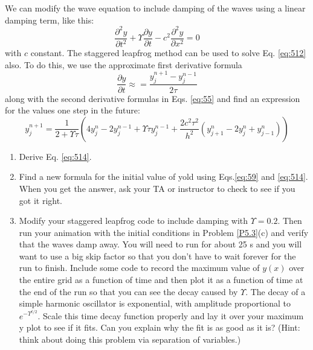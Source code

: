 We can modify the wave equation to include damping of the waves using a linear
damping term, like this:
\begin{equation}\label{eq:512}
	\frac{\partial^2 y}{\partial t^2} + \Upsilon \frac{\partial y}{\partial t} - c^2 \frac{\partial^2 y}{\partial x^2} = 0
\end{equation}
with $c$ constant. The staggered leapfrog method can be used to solve Eq. \ref{eq:512}
also. To do this, we use the approximate first derivative formula
\begin{equation}\label{eq:513}
\frac{\partial y}{\partial t } \approx = \frac{y_j^{n+1} - y_j^{n-1}}{2 \tau}
\end{equation}
along with the second derivative formulas in Eqs. \ref{eq:55} and find an expression for
the values one step in the future:
\begin{equation}\label{eq:514}
y^{n+1}_j = \frac{1}{2+ \Upsilon \tau}(4y^n_j-2y^{n-1}_j+ \Upsilon \tau y^{n-1}_j + \frac{2c^2 \tau^2}{h^2}(y^n_{j+1} - 2y^n_j + y^n_{j-1}))
\end{equation}
\begin{problem}\label{P5.4} 
\begin{enumerate}[label=(\alph*)]
	\item Derive Eq. \ref{eq:514}.
	\item Find a new formula for the initial value of yold using Eqs.\ref{eq:59} and
\ref{eq:514}. When you get the answer, ask your TA or instructor to check to
see if you got it right.
\item Modify your staggered leapfrog code to include damping with $ \Upsilon = 0.2$.
Then run your animation with the initial conditions in Problem \ref{P5.3}(c)
and verify that the waves damp away. You will need to run for about
25 s and you will want to use a big skip factor so that you don\rq t have
to wait forever for the run to finish. Include some code to record the
maximum value of $y(x)$ over the entire grid as a function of time and
then plot it as a function of time at the end of the run so that you can
see the decay caused by $\Upsilon$. The decay of a simple harmonic oscillator
is exponential, with amplitude proportional to $e^{−\Upsilon^{ t/2}}$. Scale this time
decay function properly and lay it over your maximum y plot to see if
it fits. Can you explain why the fit is as good as it is? (Hint: think about
doing this problem via separation of variables.)

\end{enumerate}
\end{problem}
